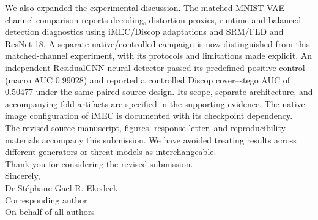 \documentclass[10pt,a4paper]{article}
\begin{document}
We also expanded the experimental discussion. The matched MNIST-VAE channel comparison reports decoding, distortion proxies, runtime and balanced detection diagnostics using iMEC/Discop adaptations and SRM/FLD and ResNet-18. A separate native/controlled campaign is now distinguished from this matched-channel experiment, with its protocols and limitations made explicit. An independent ResidualCNN neural detector passed its predefined positive control (macro AUC 0.99028) and reported a controlled Discop cover--stego AUC of 0.50477 under the same paired-source design. Its scope, separate architecture, and accompanying fold artifacts are specified in the supporting evidence. The native image configuration of iMEC is documented with its checkpoint dependency.\\[0.7em]
The revised source manuscript, figures, response letter, and reproducibility materials accompany this submission. We have avoided treating results across different generators or threat models as interchangeable.\\[1em]
Thank you for considering the revised submission.\\[1.4em]
Sincerely,\\[0.4em]
Dr St\'ephane Ga\"el R. Ekodeck\\ Corresponding author\\ On behalf of all authors
\end{document}

